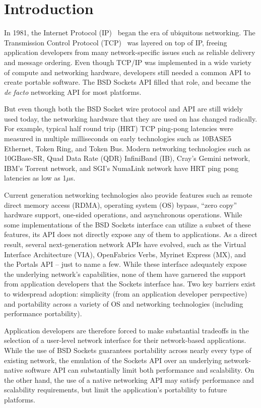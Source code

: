 \section{Introduction}
\label{sec:introduction}


In 1981, the Internet Protocol (IP)~\cite{RFC791} began the era of
ubiquitous networking.  The Transmission Control Protocol
(TCP)~\cite{RFC793} was layered on top of IP, freeing application
developers from many network-specific issues such as reliable delivery
and message ordering.  Even though TCP/IP was implemented in a wide
variety of compute and networking hardware, developers still needed a
common API to create portable software.
%
The BSD Sockets API filled that role, and became the {\em de facto}
networking API for most platforms.  

But even though both the BSD Socket wire protocol and API are still
widely used today, the networking hardware that they are used on has
changed radically.
%
For example, typical half round trip (HRT) TCP ping-pong latencies
were measured in multiple milliseconds on early technologies such as
10BASE5 Ethernet, Token Ring, and Token Bus.
%
Modern networking technologies such as 10GBase-SR, Quad Data Rate
(QDR) InfiniBand (IB), Cray's Gemini network, IBM's Torrent network,
and SGI's NumaLink network have HRT ping pong latencies as low as
1$\mu$s.

Current generation networking technologies also provide features such
as remote direct memory access (RDMA), operating system (OS) bypass,
``zero copy'' hardware support, one-sided operations, and asynchronous
operations.
%
While some implementations of the BSD Sockets interface can utilize a
subset of these features, its API does not directly expose any of them
to applications.
%
As a direct result, several next-generation network APIs have evolved,
such as the Virtual Interface Architecture (VIA), OpenFabrics Verbs,
Myrinet Express (MX), and the Portals API -- just to name a few.
%
While these interface adequately expose the underlying network's
capabilities, none of them have garnered the support from application
developers that the Sockets interface has.
%
Two key barriers exist to widespread adoption: simplicity (from an
application developer perspective) and portability across a variety of
OS and networking technologies (including performance portability).

Application developers are therefore forced to make substantial
tradeoffs in the selection of a user-level network interface for their
network-based applications.
%
While the use of BSD Sockets guarantees portability across nearly
every type of existing network, the emulation of the Sockets API over
an underlying network-native software API can substantially limit both
performance and scalability.
%
On the other hand, the use of a native networking API may satisfy
performance and scalability requirements, but limit the application's
portability to future platforms.

